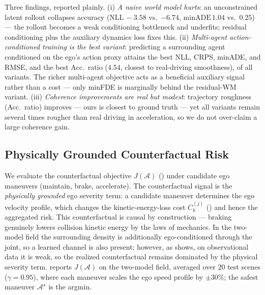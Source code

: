 \documentclass[journal]{IEEEtran}
\begin{document}
Three findings, reported plainly. (i) \emph{A naive world model hurts}: an unconstrained latent rollout collapses accuracy ($\mathrm{NLL}\,{-}3.58$ vs.\ ${-}6.74$, $\mathrm{minADE}\,1.04$ vs.\ $0.25$) --- the rollout becomes a weak conditioning bottleneck and underfits; residual conditioning plus the auxiliary dynamics loss fixes this. (ii) \emph{Multi-agent action-conditioned training is the best variant}: predicting a surrounding agent conditioned on the ego's action proxy attains the best NLL, CRPS, minADE, and RMSE, and the best Acc.\ ratio ($4.54$, closest to real-driving smoothness), of all variants. The richer multi-agent objective acts as a beneficial auxiliary signal rather than a cost --- only minFDE is marginally behind the residual-WM variant. (iii) \emph{Coherence improvements are real but modest}: trajectory roughness (Acc.\ ratio) improves --- ours is closest to ground truth --- yet all variants remain several times rougher than real driving in acceleration, so we do not over-claim a large coherence gain.

\subsection{Physically Grounded Counterfactual Risk}\label{sec:results_counterfactual}
We evaluate the counterfactual objective $J(\mathcal{A})$ () under candidate ego maneuvers (maintain, brake, accelerate). The counterfactual signal is the \emph{physically grounded} ego severity term: a candidate maneuver determines the ego velocity profile, which changes the kinetic-energy-loss cost $C^{(j)}_k$ () and hence the aggregated risk. This counterfactual is causal by construction --- braking genuinely lowers collision kinetic energy by the laws of mechanics. In the two-model field the surrounding density is additionally ego-conditioned through the joint, so a learned channel is also present; however, as  shows, on observational data it is weak, so the realized counterfactual remains dominated by the physical severity term.  reports $J(\mathcal{A})$ on the two-model field, averaged over $20$ test scenes ($\gamma=0.95$), where each maneuver scales the ego speed profile by $\pm30\%$; the safest maneuver $\mathcal{A}^\star$ is the argmin.
\end{document}
